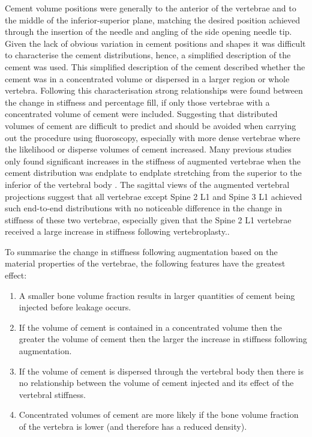 Cement volume positions were generally to the anterior of the vertebrae and to
the middle of the inferior-superior plane, matching the desired position
\cite{Nice2013}
achieved through the insertion of the needle and angling of the side opening
needle tip. 
Given the lack of obvious
variation in cement positions and shapes it was difficult to characterise the
cement distributions, hence, a simplified description of the cement was used.
This simplified description of the cement described whether the cement was in a
concentrated volume or dispersed in a larger region or whole vertebra.
Following this
characterisation strong relationships were found between the change in
stiffness and percentage fill, if only those vertebrae with a concentrated
volume of cement were included.  Suggesting that distributed volumes of cement
are difficult to predict and should be avoided when carrying out the procedure
using fluoroscopy, especially with more dense vertebrae where the likelihood or
disperse volumes of cement increased.
Many previous studies only found significant increases in the stiffness of
augmented vertebrae when the cement distribution was endplate to endplate
stretching from the superior to the inferior of the vertebral body
\cite{Chevalier2008,aquarius2014prophylactic,steens2007influence}. The sagittal
views of the augmented vertebral projections suggest that all vertebrae except
Spine 2 L1 and Spine 3 L1 achieved such end-to-end distributions with no
noticeable difference in the change in stiffness of these two vertebrae,
especially given that the Spine 2 L1 vertebrae received a large increase in
stiffness following vertebroplasty..

To summarise the change in stiffness following augmentation based on the
material properties of the vertebrae, the following features have the greatest
effect: 
\begin{enumerate} 
	\item A smaller bone volume fraction results in
	larger quantities of cement being injected before leakage occurs.
	\item If the volume of cement is contained in a concentrated volume then the
	greater the volume of cement then the larger the increase in stiffness
	following augmentation.  
	\item If the volume of cement is dispersed
	through the vertebral body then there is no relationship between the
	volume of cement injected and its effect of the vertebral stiffness.
	\item Concentrated volumes of cement are more likely if the bone volume
	fraction of the vertebra is lower (and therefore has a reduced density).
\end{enumerate}


